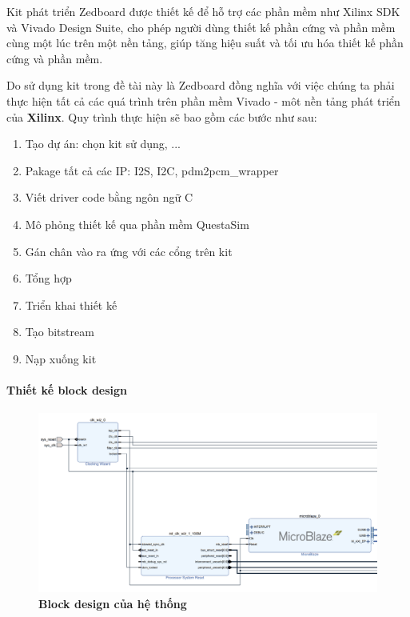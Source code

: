 Kit phát triển Zedboard được thiết kế để hỗ trợ các phần mềm như Xilinx SDK và Vivado Design Suite, cho phép người dùng thiết kế phần cứng và phần mềm cùng một lúc trên một nền tảng,  giúp tăng hiệu suất và tối ưu hóa thiết kế phần cứng và phần mềm.

Do sử dụng kit trong đề tài này là Zedboard đồng nghĩa với việc chúng ta phải thực hiện tất cả các quá trình trên phần mềm Vivado - môt nền tảng phát triển của \textbf{Xilinx}.
Quy trình thực hiện sẽ bao gồm các bước như sau:
\begin{enumerate}
    \item Tạo dự án: chọn kit sử dụng, ...
    \item Pakage tất cả các IP: I2S, I2C, pdm2pcm\_wrapper
    \item Viết driver code bằng ngôn ngữ C
    \item Mô phỏng thiết kế qua phần mềm QuestaSim
    \item Gán chân vào ra ứng với các cổng trên kit
    \item Tổng hợp
    \item Triển khai thiết kế
    \item Tạo bitstream
    \item Nạp xuống kit
\end{enumerate}



\paragraph{Thiết kế block design}

\begin{figure}[H]
    \centering
    \includegraphics[width=15cm]{Images/Chuong5/fpga/block_design_1.png}
    \caption[Block design của hệ thống]{\bfseries \fontsize{12pt}{0pt}\selectfont Block design của hệ thống}
    \label{bd1}
\end{figure}

